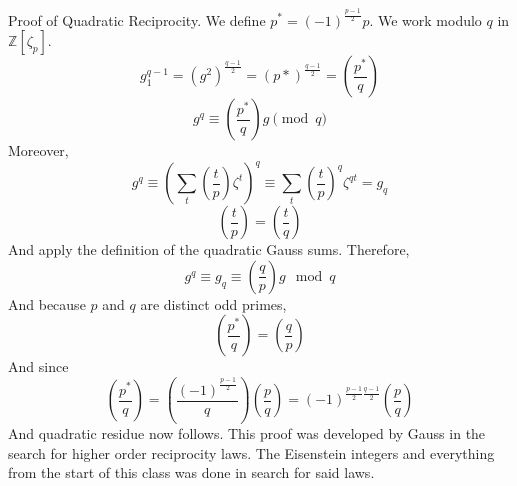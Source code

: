 \documentclass{article}
\begin{document}
Proof of Quadratic Reciprocity. We define $p^* = (-1)^{\frac{p-1}{2}}p $. We
work modulo $q$ in $\mathbb{Z}[\zeta_p]$. 
\[ g_1^{q-1} = (g^2)^{\frac{q-1}{2}} = (p*)^{\frac{q-1}{2}} =
\left(\frac{p^*}{q}\right) \]
\[ g^q \equiv \left(\frac{p^*}{q}\right)g\pmod{q} \]
Moreover, 
\[ g^q \equiv\left(\sum_t \left(\frac{t}{p}\right)\zeta^t\right)^q \equiv \sum_t
\left(\frac{t}{p}\right)^q \zeta^{qt} = g_q \]
\[ \left(\frac{t}{p}\right) = \left(\frac{t}{q}\right) \]
And apply the definition of the quadratic Gauss sums. 
Therefore,
\[ g^q \equiv g_q \equiv \left(\frac{q}{p}\right)g \mod{q} \]
And because $p$ and $q$ are distinct odd primes, 
\[ \left(\frac{p^*}{q}\right) = \left(\frac{q}{p}\right) \]
And since 
\[ \left(\frac{p^*}{q}\right) =
\left(\frac{(-1)^{\frac{p-1}{2}}}{q}\right) \left(\frac{p}{q}\right)  =
(-1)^{\frac{p-1}{2}\frac{q-1}{2}} \left( \frac{p}{q} \right) \]
And quadratic residue now follows.  This proof was developed by Gauss in the
search for higher order reciprocity laws. The Eisenstein integers and everything
from the start of this class was done in search for said laws.  
\end{document}
